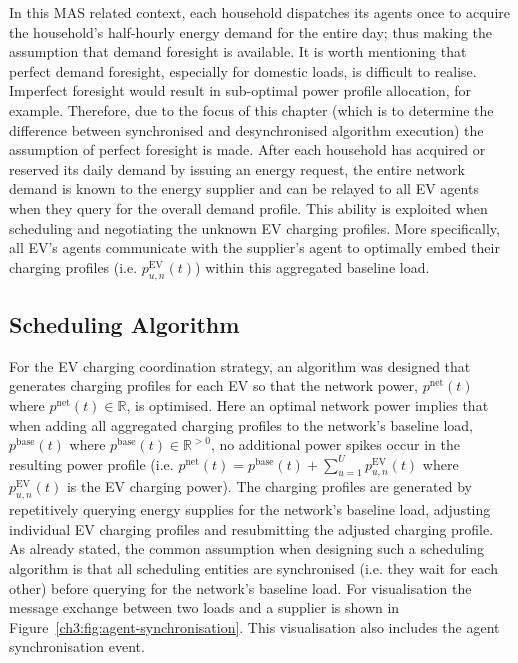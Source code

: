 In this MAS related context, each household dispatches its agents once to acquire the household's half-hourly energy demand for the entire day; thus making the assumption that demand foresight is available.
It is worth mentioning that perfect demand foresight, especially for domestic loads, is difficult to realise.
Imperfect foresight would result in sub-optimal power profile allocation, for example.
Therefore, due to the focus of this chapter (which is to determine the difference between synchronised and desynchronised algorithm execution) the assumption of perfect foresight is made.
After each household has acquired or reserved its daily demand by issuing an energy request, the entire network demand is known to the energy supplier and can be relayed to all EV agents when they query for the overall demand profile.
This ability is exploited when scheduling and negotiating the unknown EV charging profiles.
More specifically, all EV's agents communicate with the supplier's agent to optimally embed their charging profiles (i.e. $p^\text{EV}_{u,n}(t)$) within this aggregated baseline load.

\subsection{Scheduling Algorithm}
\label{ch3:subsec:scheduling-algorithm}

For the EV charging coordination strategy, an algorithm was designed that generates charging profiles for each EV so that the network power, $p^\text{net}(t)$ where $p^\text{net}(t) \in \mathbb{R}$, is optimised.
Here an optimal network power implies that when adding all aggregated charging profiles to the network's baseline load, $p^\text{base}(t)$  where $p^\text{base}(t) \in \mathbb{R}^{>0}$, no additional power spikes occur in the resulting power profile (i.e. $p^\text{net}(t) = p^\text{base}(t) + \sum_{u=1}^U p^\text{EV}_{u,n}(t)$ where $p^\text{EV}_{u,n}(t)$ is the EV charging power).
The charging profiles are generated by repetitively querying energy supplies for the network's baseline load, adjusting individual EV charging profiles and resubmitting the adjusted charging profile.
As already stated, the common assumption when designing such a scheduling algorithm is that all scheduling entities are synchronised (i.e. they wait for each other) before querying for the network's baseline load.
For visualisation the message exchange between two loads and a supplier is shown in Figure~\ref{ch3:fig:agent-synchronisation}.
This visualisation also includes the agent synchronisation event.

